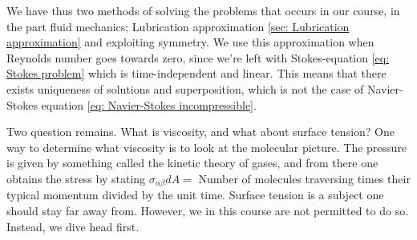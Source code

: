 \documentclass[a4paper]{article}
\begin{document}
\vspace*{0.5cm}\noindent
We have thus two methods of solving the problems that occurs in our course, in the part fluid mechanics; Lubrication approximation \ref{sec: Lubrication approximation} and exploiting symmetry.
We use this approximation when Reynolds number goes towards zero, since we're left with Stokes-equation \eqref{eq: Stokes problem} which is time-independent and linear.
This means that there exists uniqueness of solutions and superposition, which is not the case of Navier-Stokes equation \eqref{eq: Navier-Stokes incompressible}.

\vspace*{0.5cm}\noindent
Two question remains. What is viscosity, and what about surface tension? One way to determine what viscosity is to look at the molecular picture. The pressure is given by something called the kinetic theory of gases, and from there one obtains the stress by stating $\sigma_{\alpha\beta}dA = $ Number of molecules traversing times their typical momentum divided by the unit time.
Surface tension is a subject one should stay far away from. However, we in this course are not permitted to do so. Instead, we dive head first.
\end{document}
